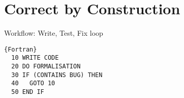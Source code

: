 \section{Correct by Construction}

\begin{frame}[fragile]{Workflow: Write, Test, Fix loop}

\begin{lstlisting}{Fortran}
  10 WRITE CODE
  20 DO FORMALISATION
  30 IF (CONTAINS BUG) THEN
  40   GOTO 10
  50 END IF
\end{lstlisting}

\end{frame}
